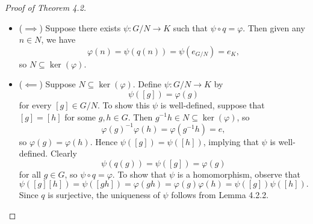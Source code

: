 \documentclass[pmath347]{subfiles}
\begin{document}
    \begin{proof}[Proof of Theorem 4.2]
        \begin{itemize}
            \item ($\implies$) Suppose there exists $\psi:G /N\to K$ such that $\psi\circ q = \varphi$. Then given any $n\in N$, we have
                \begin{equation*}
                    \varphi\left( n \right) = \psi\left( q\left( n \right)  \right) = \psi\left( e_{G /N} \right) = e_K,
                \end{equation*}
                so $N\subseteq\ker\left( \varphi \right)$. \qqqedsym
            \item ($\impliedby$) Suppose $N\subseteq\ker\left( \varphi \right)$. Define $\psi: G /N\to K$ by
                \begin{equation*}
                    \psi\left( \left[ g \right]  \right) = \varphi\left( g \right)
                \end{equation*}
                for every $\left[ g \right] \in G /N$. To show this $\psi$ is well-defined, suppose that $\left[ g \right] = \left[ h \right] $ for some $g,h\in G$. Then $g^{-1} h \in N \subseteq\ker\left( \varphi \right)$, so
                \begin{equation*}
                    \varphi\left( g \right) ^{-1} \varphi\left( h \right) = \varphi\left( g^{-1} h \right) = e,
                \end{equation*}
                so $\varphi\left( g \right) = \varphi\left( h \right)$. Hence $\psi\left( \left[ g \right]  \right) = \psi\left( \left[ h \right]  \right)$, implying that $\psi$ is well-defined. Clearly
                \begin{equation*}
                    \psi\left( q\left( g \right)  \right) = \psi\left( \left[ g \right]  \right) = \varphi\left( g \right) 
                \end{equation*}
                for all $g\in G$, so $\psi\circ q = \varphi$. To show that $\psi$ is a homomorphism, observe that
                \begin{equation*}
                    \psi\left( \left[ g \right] \left[ h \right]  \right) = \psi\left( \left[ gh \right]  \right) = \varphi\left( gh \right) = \varphi\left( g \right) \varphi\left( h \right) = \psi\left( \left[ g \right]  \right) \psi\left( \left[ h \right]  \right).
                \end{equation*}
                Since $q$ is surjective, the uniqueness of $\psi$ follows from Lemma 4.2.2.
        \end{itemize} 
    \end{proof}
\end{document}
